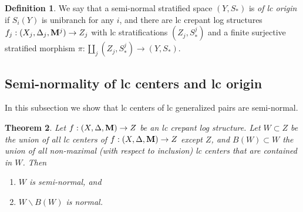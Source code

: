 \documentclass[11pt]{amsart}
\numberwithin{equation}{section}
\newcommand{\Mm}{{\bf{M}}}
\newtheorem{thm}{Theorem}[subsection]
\theoremstyle{definition}
\newtheorem{defn}[thm]{Definition}
\theoremstyle{definition}
\theoremstyle{definition}
\begin{document}
\begin{defn}\label{defn: of glc origin}
We say that a semi-normal stratified space $(Y,S_*)$ is \textit{of lc origin} if $S_i(Y)$ is unibranch for any $i$, and there are lc crepant log structures $f_j:(X_j,\Delta_j,\Mm^j)\to Z_j$ with lc stratifications $(Z_j,S_{*}^j)$ and a finite surjective stratified morphism $\pi: \amalg_j(Z_j,S_{*}^j)\to (Y,S_*)$.
\end{defn}

\subsection{Semi-normality of lc centers and lc origin}
In this subsection we show that lc centers of lc generalized pairs are semi-normal.

\begin{thm}\label{thm: glc locus is semi-normal}
Let $f:(X,\Delta,\Mm)\to Z$ be an lc crepant log structure. Let $W\subset Z$ be the union of all lc centers of $f:(X,\Delta,\Mm)\to Z$ except $Z$, and $B(W)\subset W$ the union of all non-maximal (with respect to inclusion) lc centers that are contained in $W$. Then
\begin{enumerate}
    \item $W$ is semi-normal, and
    \item $W\backslash B(W)$ is normal.
\end{enumerate}
\end{thm}
\end{document}
